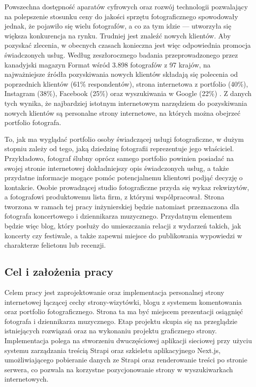 \documentclass[12pt]{article}
\numberwithin{figure}{section}
\begin{document}
\begin{sloppypar}
Powszechna dostępność aparatów cyfrowych oraz rozwój technologii pozwalający na polepszenie stosunku ceny do jakości sprzętu fotograficznego spowodowały jednak, że pojawiło się wielu fotografów, a co za tym idzie --- utworzyła się większa konkurencja na rynku. Trudniej jest znaleźć nowych klientów. Aby pozyskać zlecenia, w obecnych czasach konieczna jest więc odpowiednia promocja świadczonych usług. Według zeszłorocznego badania przeprowadzonego przez kanadyjski magazyn Format wśród 3.898 fotografów z 97 krajów, na najważniejsze źródła pozyskiwania nowych klientów składają się polecenia od poprzednich klientów (61\% respondentów), strona internetowa z portfolio (40\%), Instagram (38\%), Facebook (25\%) oraz wyszukiwania w Google (22\%) \cite{stateofphotography}. Z danych tych wynika, że najbardziej istotnym internetowym narzędziem do pozyskiwania nowych klientów są personalne strony internetowe, na których można obejrzeć portfolio fotografa.

To, jak ma wyglądać portfolio osoby świadczącej usługi fotograficzne, w dużym stopniu zależy od tego, jaką dziedzinę fotografii reprezentuje jego właściciel. Przykładowo, fotograf ślubny oprócz samego portfolio powinien posiadać na swojej stronie internetowej dokładniejszy opis świadczonych usług, a także przydatne informacje mogące pomóc potencjalnemu klientowi podjąć decyzję o kontakcie. Osobie prowadzącej studio fotograficzne przyda się wykaz rekwizytów, a fotografowi produktowemu lista firm, z którymi współpracował. Strona tworzona w ramach tej pracy inżynierskiej będzie natomiast przeznaczona dla fotografa koncertowego i dziennikarza muzycznego. Przydatnym elementem będzie więc blog, który posłuży do umieszczania relacji z wydarzeń takich, jak koncerty czy festiwale, a także zapewni miejsce do publikowania wypowiedzi w charakterze felietonu lub recenzji.



\subsection{Cel i założenia pracy}

Celem pracy jest zaprojektowanie oraz implementacja personalnej strony internetowej łączącej cechy strony-wizytówki, blogu z systemem komentowania oraz portfolio fotograficznego. Strona ta ma być miejscem prezentacji osiągnięć fotografa i dziennikarza muzycznego. Etap projektu skupia się na przeglądzie istniejących rozwiązań oraz na wykonaniu projektu graficznego strony. Implementacja polega na stworzeniu dwuczęściowej aplikacji sieciowej przy użyciu systemu zarządzania treścią Strapi oraz szkieletu aplikacyjnego Next.js, umożliwiającego pobieranie danych ze Strapi oraz renderowanie treści po stronie serwera, co pozwala na korzystne pozycjonowanie strony w wyszukiwarkach internetowych. 


\end{sloppypar}
\end{document}
